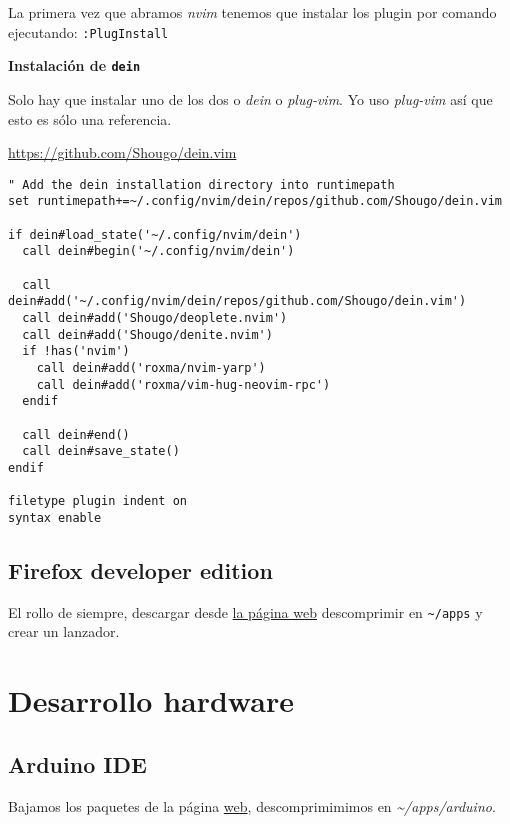 \documentclass[
  12pt,
  spanish,
]{article}
\begin{document}
La primera vez que abramos \emph{nvim} tenemos que instalar los plugin
por comando ejecutando: \texttt{:PlugInstall}

\textbf{Instalación de \texttt{dein}}

Solo hay que instalar uno de los dos o \emph{dein} o \emph{plug-vim}. Yo
uso \emph{plug-vim} así que esto es sólo una referencia.

\url{https://github.com/Shougo/dein.vim}

\begin{verbatim}
" Add the dein installation directory into runtimepath
set runtimepath+=~/.config/nvim/dein/repos/github.com/Shougo/dein.vim

if dein#load_state('~/.config/nvim/dein')
  call dein#begin('~/.config/nvim/dein')

  call dein#add('~/.config/nvim/dein/repos/github.com/Shougo/dein.vim')
  call dein#add('Shougo/deoplete.nvim')
  call dein#add('Shougo/denite.nvim')
  if !has('nvim')
    call dein#add('roxma/nvim-yarp')
    call dein#add('roxma/vim-hug-neovim-rpc')
  endif

  call dein#end()
  call dein#save_state()
endif

filetype plugin indent on
syntax enable
\end{verbatim}

\hypertarget{firefox-developer-edition}{%
\subsection{Firefox developer edition}\label{firefox-developer-edition}}

El rollo de siempre, descargar desde
\href{https://www.mozilla.org/en-US/firefox/developer/}{la página web}
descomprimir en \texttt{\textasciitilde{}/apps} y crear un lanzador.

\hypertarget{desarrollo-hardware}{%
\section{Desarrollo hardware}\label{desarrollo-hardware}}

\hypertarget{arduino-ide}{%
\subsection{Arduino IDE}\label{arduino-ide}}

Bajamos los paquetes de la página \href{https://www.arduino.cc}{web},
descomprimimimos en \emph{\textasciitilde/apps/arduino}.
\end{document}

